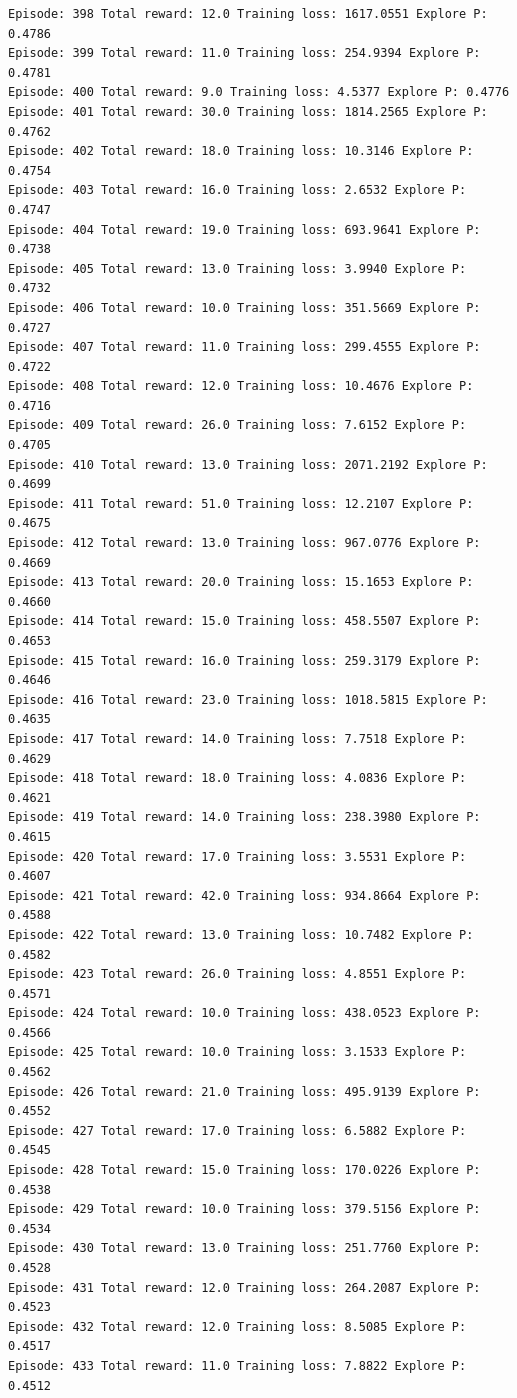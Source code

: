 \documentclass[11pt]{article}
\begin{document}
\begin{Verbatim}[commandchars=\\\{\}]
Episode: 398 Total reward: 12.0 Training loss: 1617.0551 Explore P: 0.4786
Episode: 399 Total reward: 11.0 Training loss: 254.9394 Explore P: 0.4781
Episode: 400 Total reward: 9.0 Training loss: 4.5377 Explore P: 0.4776
Episode: 401 Total reward: 30.0 Training loss: 1814.2565 Explore P: 0.4762
Episode: 402 Total reward: 18.0 Training loss: 10.3146 Explore P: 0.4754
Episode: 403 Total reward: 16.0 Training loss: 2.6532 Explore P: 0.4747
Episode: 404 Total reward: 19.0 Training loss: 693.9641 Explore P: 0.4738
Episode: 405 Total reward: 13.0 Training loss: 3.9940 Explore P: 0.4732
Episode: 406 Total reward: 10.0 Training loss: 351.5669 Explore P: 0.4727
Episode: 407 Total reward: 11.0 Training loss: 299.4555 Explore P: 0.4722
Episode: 408 Total reward: 12.0 Training loss: 10.4676 Explore P: 0.4716
Episode: 409 Total reward: 26.0 Training loss: 7.6152 Explore P: 0.4705
Episode: 410 Total reward: 13.0 Training loss: 2071.2192 Explore P: 0.4699
Episode: 411 Total reward: 51.0 Training loss: 12.2107 Explore P: 0.4675
Episode: 412 Total reward: 13.0 Training loss: 967.0776 Explore P: 0.4669
Episode: 413 Total reward: 20.0 Training loss: 15.1653 Explore P: 0.4660
Episode: 414 Total reward: 15.0 Training loss: 458.5507 Explore P: 0.4653
Episode: 415 Total reward: 16.0 Training loss: 259.3179 Explore P: 0.4646
Episode: 416 Total reward: 23.0 Training loss: 1018.5815 Explore P: 0.4635
Episode: 417 Total reward: 14.0 Training loss: 7.7518 Explore P: 0.4629
Episode: 418 Total reward: 18.0 Training loss: 4.0836 Explore P: 0.4621
Episode: 419 Total reward: 14.0 Training loss: 238.3980 Explore P: 0.4615
Episode: 420 Total reward: 17.0 Training loss: 3.5531 Explore P: 0.4607
Episode: 421 Total reward: 42.0 Training loss: 934.8664 Explore P: 0.4588
Episode: 422 Total reward: 13.0 Training loss: 10.7482 Explore P: 0.4582
Episode: 423 Total reward: 26.0 Training loss: 4.8551 Explore P: 0.4571
Episode: 424 Total reward: 10.0 Training loss: 438.0523 Explore P: 0.4566
Episode: 425 Total reward: 10.0 Training loss: 3.1533 Explore P: 0.4562
Episode: 426 Total reward: 21.0 Training loss: 495.9139 Explore P: 0.4552
Episode: 427 Total reward: 17.0 Training loss: 6.5882 Explore P: 0.4545
Episode: 428 Total reward: 15.0 Training loss: 170.0226 Explore P: 0.4538
Episode: 429 Total reward: 10.0 Training loss: 379.5156 Explore P: 0.4534
Episode: 430 Total reward: 13.0 Training loss: 251.7760 Explore P: 0.4528
Episode: 431 Total reward: 12.0 Training loss: 264.2087 Explore P: 0.4523
Episode: 432 Total reward: 12.0 Training loss: 8.5085 Explore P: 0.4517
Episode: 433 Total reward: 11.0 Training loss: 7.8822 Explore P: 0.4512

\end{Verbatim}
\end{document}
